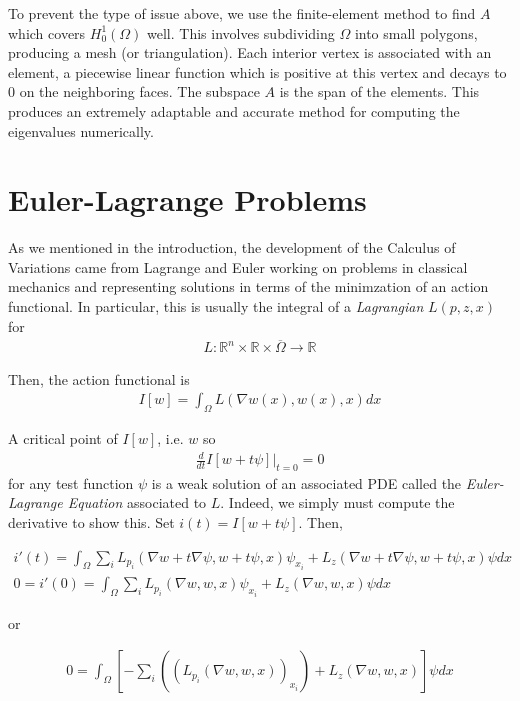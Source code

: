 \documentclass{article}
\newcommand{\R}{{\mathbb{R}}}
\newcommand{\cl}[1]{{\overline{#1}}}
\begin{document}
	\vspace{1cm}
	To prevent the type of issue above, we use the finite-element method to find $A$ which covers $H^{1}_{0}(\Omega)$ well. This involves subdividing $\Omega$ into small polygons, producing a mesh (or triangulation). Each interior vertex is associated with an element, a piecewise linear function which is positive at this vertex and decays to $0$ on the neighboring faces. The subspace $A$ is the span of the elements. This produces an extremely adaptable and accurate method for computing the eigenvalues numerically. 
	
	\section{Euler-Lagrange Problems}
	
	As we mentioned in the introduction, the development of the Calculus of Variations came from Lagrange and Euler working on problems in classical mechanics and representing solutions in terms of the minimzation of an action functional. In particular, this is usually the integral of a \textit{Lagrangian} $L(p,z,x)$ for 
	\begin{align*}
		L:\R^{n} \times \R \times \cl{\Omega} \to \R
	\end{align*}
	
	Then, the action functional is 
	\begin{align*}
		I[w] = \int_{\Omega} L(\nabla w(x),w(x),x)dx
	\end{align*}
	
	A critical point of $I[w]$, i.e. $w$ so 
	\begin{align*}
		\frac{d}{dt} I[w + t \psi]|_{t=0} = 0
	\end{align*}
	for any test function $\psi$ is a weak solution of an associated PDE called the \textit{Euler-Lagrange Equation} associated to $L$. Indeed, we simply must compute the derivative to show this. Set $i(t) = I[w + t \psi]$. Then, 
	
	\begin{align*}
		i'(t) = \int_{\Omega} \sum_{i} L_{p_i}( \nabla w + t \nabla \psi, w+t\psi, x)\psi_{x_i} + L_{z}( \nabla w + t \nabla \psi, w+t\psi, x) \psi dx\\
		0=i'(0) =  \int_{\Omega} \sum_{i} L_{p_i}(\nabla w,w,x)\psi_{x_i} + L_{z}(\nabla w, w,x)\psi dx
	\end{align*}
	
	or
	
	\begin{align*}
		0 = \int_{\Omega} \left[-\sum_{i} ((L_{p_i}(\nabla w, w, x))_{x_i}) + L_{z}(\nabla w, w,x) \right] \psi dx
	\end{align*}
	
\end{document}
